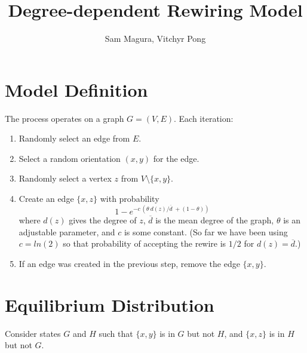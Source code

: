 \documentclass[a4paper,10pt]{article}
\title{Degree-dependent Rewiring Model}
\author{Sam Magura, Vitchyr Pong}
\begin{document}
\maketitle

\section{Model Definition}

The process operates on a graph $G = (V, E)$. Each iteration:

\begin{enumerate}
 \item Randomly select an edge from $E$.
 \item Select a random orientation $(x, y)$ for the edge.
 \item \label{item:z} Randomly select a vertex $z$ from $V \setminus \{x, y\}$.
 \item \label{item:pr} Create an edge $\{x, z\}$ with probability
\begin{equation}
 1 - e^{-c\,(\theta \: d(z) / \overline{d}\; + (1 - \theta))}
\end{equation}
where $d(z)$ gives the degree of $z$, $\overline{d}$ is the mean degree of the graph, $\theta$ is an adjustable parameter, and $c$ is some constant. (So far we have been using $c = ln(2)$ so that probability of accepting the rewire is $1/2$ for $d(z) = \overline{d}$.)
 \item If an edge was created in the previous step, remove the edge $\{x, y\}$.
\end{enumerate}

\section{Equilibrium Distribution}
Consider states $G$ and $H$ such that $\{x, y\}$ is in $G$ but not $H$, and $\{x, z\}$ is in $H$ but not $G$. 
\end{document}
